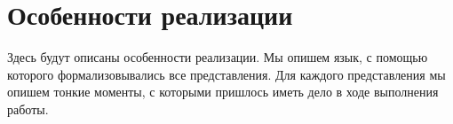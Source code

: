 \section{Особенности реализации}
\label{sec:impl}
Здесь будут описаны особенности реализации. Мы опишем язык, с помощью которого формализовывались все представления. Для каждого представления мы опишем тонкие моменты, с которыми пришлось иметь дело в ходе выполнения работы.


